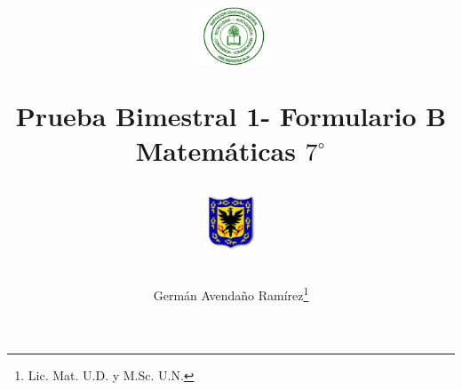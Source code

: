 \documentclass[10pt,letterpaper,addpoints]{exam}
\begin{document}
\title{\begin{minipage}{.2\textwidth}
        \includegraphics[height=1.75cm]{Images/logo-colegio.png}
       \end{minipage}
\begin{minipage}{.55\textwidth}
 \begin{center}
Prueba Bimestral 1- Formulario \textbf{B}\\Matemáticas $7^{\circ}$
\end{center}
\end{minipage}
\begin{minipage}{.2\textwidth}
\includegraphics[height=1.75cm]{Images/logo-sed.png} 
\end{minipage}
}
\author{Germ\'{a}n Avendaño Ram\'{i}rez\thanks{Lic. Mat. U.D. y M.Sc. U.N.}}
\date{}
\maketitle
\begin{center}
\end{center}
\vspace{0.05in}
\end{document}

